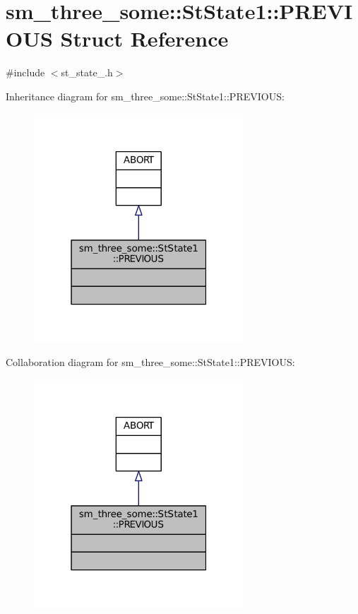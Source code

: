 \hypertarget{structsm__three__some_1_1StState1_1_1PREVIOUS}{}\section{sm\+\_\+three\+\_\+some\+:\+:St\+State1\+:\+:P\+R\+E\+V\+I\+O\+US Struct Reference}
\label{structsm__three__some_1_1StState1_1_1PREVIOUS}


{\ttfamily \#include $<$st\+\_\+state\+\_.\+h$>$}



Inheritance diagram for sm\+\_\+three\+\_\+some\+:\+:St\+State1\+:\+:P\+R\+E\+V\+I\+O\+US\+:
\nopagebreak
\begin{figure}[H]
\begin{center}
\leavevmode
\includegraphics[width=223pt]{structsm__three__some_1_1StState1_1_1PREVIOUS__inherit__graph}
\end{center}
\end{figure}


Collaboration diagram for sm\+\_\+three\+\_\+some\+:\+:St\+State1\+:\+:P\+R\+E\+V\+I\+O\+US\+:
\nopagebreak
\begin{figure}[H]
\begin{center}
\leavevmode
\includegraphics[width=223pt]{structsm__three__some_1_1StState1_1_1PREVIOUS__coll__graph}
\end{center}
\end{figure}


